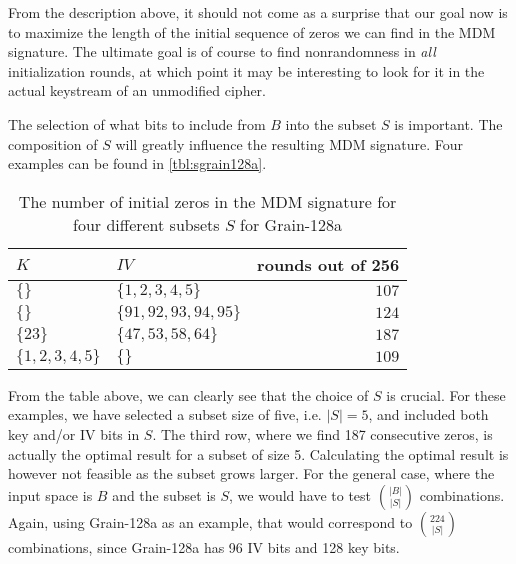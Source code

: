 {From the description above, it should not come as a surprise that our goal now is to maximize the length of the initial sequence of zeros we can find in the MDM signature. The ultimate goal is of course to find nonrandomness in \emph{all} initialization rounds, at which point it may be interesting to look for it in the actual keystream of an unmodified cipher.

The selection of what bits to include from $B$ into the subset $S$ is important. The composition of $S$ will greatly influence the resulting MDM signature. Four examples can be found in \autoref{tbl:sgrain128a}.


\begin{table}[h]
	\caption{The number of initial zeros in the MDM signature for four different subsets $S$ for Grain-128a}
    \centering
	\begin{tabular}{llr}
		\toprule
		$K$ & $IV$ & rounds out of 256 \\
		\midrule
		$\{  \}$ & $\{ 1,2,3,4,5 \}$ & $107$ \\
		$\{  \}$ & $\{ 91,92,93,94,95 \}$ & $124$ \\
		$\{ 23 \}$ & $\{ 47,53,58,64 \}$ & $187$ \\
		$\{ 1,2,3,4,5 \}$ & $\{  \}$ & $109$ \\
		\bottomrule
	\end{tabular}
	\label{tbl:sgrain128a}
\end{table}



From the table above, we can clearly see that the choice of $S$ is crucial. For these examples, we have selected a subset size of five, i.e. $|S|=5$, and included both key and/or IV bits in $S$. The third row, where we find 187 consecutive zeros, is actually the optimal result for a subset of size 5. Calculating the optimal result is however not feasible as the subset grows larger. For the general case, where the input space is $B$ and the subset is $S$, we would have to test $\binom{|B|}{|S|}$ combinations. Again, using Grain-128a as an example, that would correspond to $\binom{224}{|S|}$ combinations, since Grain-128a has 96 IV bits and 128 key bits.

}
